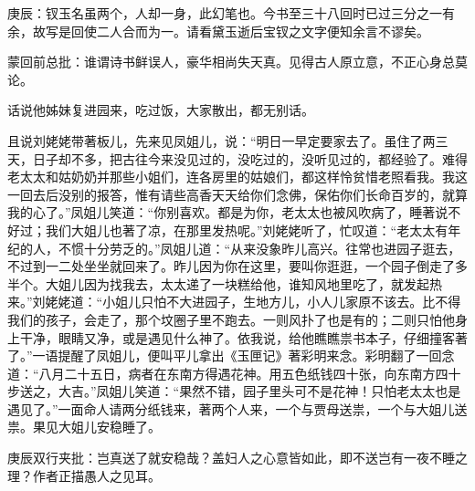 \begin{parag}

    \begin{note}庚辰：钗玉名虽两个，人却一身，此幻笔也。今书至三十八回时已过三分之一有余，故写是回使二人合而为一。请看黛玉逝后宝钗之文字便知余言不谬矣。\end{note}
\end{parag}


\begin{parag}


    \begin{note}蒙回前总批：谁谓诗书鲜误人，豪华相尚失天真。见得古人原立意，不正心身总莫论。\end{note}
\end{parag}

\begin{parag}

    话说他姊妹复进园来，吃过饭，大家散出，都无别话。
\end{parag}


\begin{parag}


    且说刘姥姥带著板儿，先来见凤姐儿，说：“明日一早定要家去了。虽住了两三天，日子却不多，把古往今来没见过的，没吃过的，没听见过的，都经验了。难得老太太和姑奶奶并那些小姐们，连各房里的姑娘们，都这样怜贫惜老照看我。我这一回去后没别的报答，惟有请些高香天天给你们念佛，保佑你们长命百岁的，就算我的心了。”凤姐儿笑道：“你别喜欢。都是为你，老太太也被风吹病了，睡著说不好过；我们大姐儿也著了凉，在那里发热呢。”刘姥姥听了，忙叹道：“老太太有年纪的人，不惯十分劳乏的。”凤姐儿道：“从来没象昨儿高兴。往常也进园子逛去，不过到一二处坐坐就回来了。昨儿因为你在这里，要叫你逛逛，一个园子倒走了多半个。大姐儿因为找我去，太太递了一块糕给他，谁知风地里吃了，就发起热来。”刘姥姥道：“小姐儿只怕不大进园子，生地方儿，小人儿家原不该去。比不得我们的孩子，会走了，那个坟圈子里不跑去。一则风扑了也是有的；二则只怕他身上干净，眼睛又净，或是遇见什么神了。依我说，给他瞧瞧祟书本子，仔细撞客著了。”一语提醒了凤姐儿，便叫平儿拿出《玉匣记》著彩明来念。彩明翻了一回念道：“八月二十五日，病者在东南方得遇花神。用五色纸钱四十张，向东南方四十步送之，大吉。”凤姐儿笑道：“果然不错，园子里头可不是花神！只怕老太太也是遇见了。”一面命人请两分纸钱来，著两个人来，一个与贾母送祟，一个与大姐儿送祟。果见大姐儿安稳睡了。\begin{note}庚辰双行夹批：岂真送了就安稳哉？盖妇人之心意皆如此，即不送岂有一夜不睡之理？作者正描愚人之见耳。\end{note}
\end{parag}


